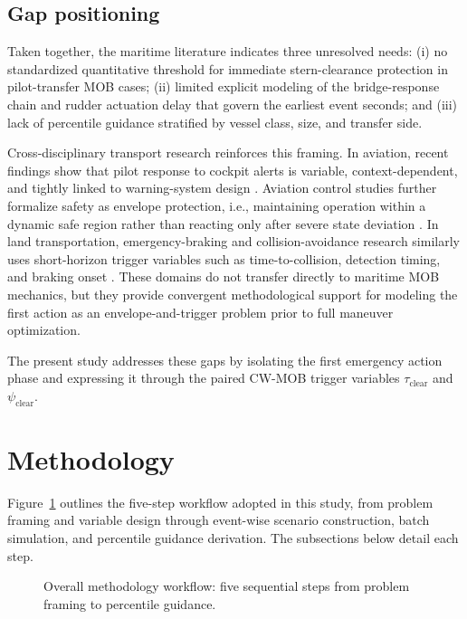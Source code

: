 \documentclass[preprint,12pt]{elsarticle}
\begin{document}
\subsection{Gap positioning}
Taken together, the maritime literature indicates three unresolved needs: (i) no standardized quantitative threshold for immediate stern-clearance protection in pilot-transfer MOB cases; (ii) limited explicit modeling of the bridge-response chain and rudder actuation delay that govern the earliest event seconds; and (iii) lack of percentile guidance stratified by vessel class, size, and transfer side.

Cross-disciplinary transport research reinforces this framing. In aviation, recent findings show that pilot response to cockpit alerts is variable, context-dependent, and tightly linked to warning-system design \cite{ref_aviation_alerts,ref_aviation_hud}. Aviation control studies further formalize safety as envelope protection, i.e., maintaining operation within a dynamic safe region rather than reacting only after severe state deviation \cite{ref_aviation_envelope}. In land transportation, emergency-braking and collision-avoidance research similarly uses short-horizon trigger variables such as time-to-collision, detection timing, and braking onset \cite{ref_land_aeb,ref_land_detection}. These domains do not transfer directly to maritime MOB mechanics, but they provide convergent methodological support for modeling the first action as an envelope-and-trigger problem prior to full maneuver optimization.

The present study addresses these gaps by isolating the first emergency action phase and expressing it through the paired CW-MOB trigger variables $\tau_{\mathrm{clear}}$ and $\psi_{\mathrm{clear}}$.

\section{Methodology}
Figure~\ref{fig:research_flow} outlines the five-step workflow adopted in this study, from problem framing and variable design through event-wise scenario construction, batch simulation, and percentile guidance derivation. The subsections below detail each step.

\begin{figure}[H]
    \centering
    \caption{Overall methodology workflow: five sequential steps from problem framing to percentile guidance.}
    \label{fig:research_flow}
\end{figure}
\end{document}

